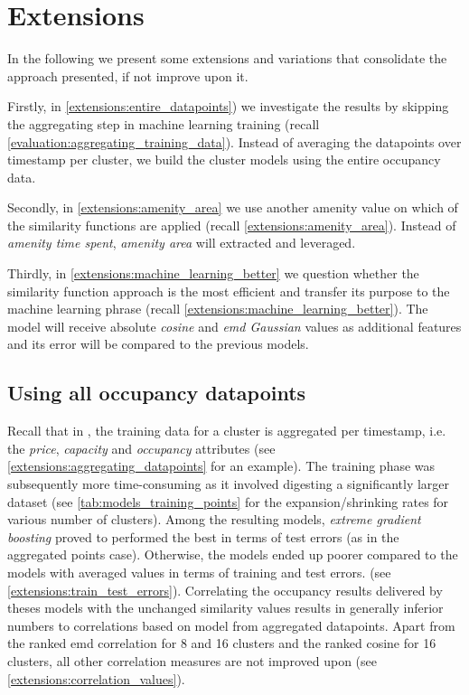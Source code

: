 {\color{green}
\section{Extensions}
\label{extensions}
In the following we present some extensions and variations that consolidate the approach presented, if not improve upon it. 

Firstly, in \autoref{extensions:entire_datapoints}) we investigate the results by skipping the aggregating step in machine learning training (recall \autoref{evaluation:aggregating_training_data}). Instead of averaging the datapoints over timestamp per cluster, we build the cluster models using the entire occupancy data.

Secondly, in \autoref{extensions:amenity_area} we use another amenity value on which of the similarity functions are applied (recall \autoref{extensions:amenity_area}). Instead of \textit{amenity time spent}, \textit{amenity area} will extracted and leveraged. 

Thirdly, in \autoref{extensions:machine_learning_better} we question whether the similarity function approach is the most efficient and transfer its purpose to the machine learning phrase (recall \autoref{extensions:machine_learning_better}). The model will receive absolute \textit{cosine} and \textit{emd Gaussian} values as additional features and its error will be compared to the previous models. 


\subsection{Using all occupancy datapoints}
\label{extensions:entire_datapoints}
Recall that in , the training data for a cluster is aggregated per timestamp, i.e. the \textit{price}, \textit{capacity} and \textit{occupancy} attributes (see \autoref{extensions:aggregating_datapoints} for an example). The training phase was subsequently more time-consuming as it involved digesting a significantly larger dataset (see \autoref{tab:models_training_points} for the expansion/shrinking rates for various number of clusters). Among the resulting models, \textit{extreme gradient boosting} proved to performed the best in terms of test errors (as in the aggregated points case). Otherwise, the models ended up poorer compared to the models with averaged values in terms of training and test errors. (see \autoref{extensions:train_test_errors}). Correlating the occupancy results delivered by theses models with the unchanged similarity values results in generally inferior numbers to correlations based on model from aggregated datapoints. Apart from the ranked emd correlation for 8 and 16 clusters and the ranked cosine for 16 clusters, all other correlation measures are not improved upon (see \autoref{extensions:correlation_values}).

}
